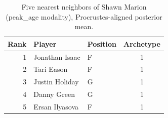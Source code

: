 \begin{table}[htbp]
  \centering\small
  \begin{tabular}{rllc}
    \toprule
    Rank & Player & Position & Archetype \\
    \midrule
    1 & Jonathan Isaac & F & 1 \\
    2 & Tari Eason & F & 1 \\
    3 & Justin Holiday & G & 1 \\
    4 & Danny Green & G & 1 \\
    5 & Ersan Ilyasova & F & 1 \\
    \bottomrule
  \end{tabular}
  \caption{Five nearest neighbors of Shawn Marion (peak_age modality), Procrustes-aligned posterior mean.}
  \label{tab:Shawn_Marion_neighbors_peak_age}
\end{table}

